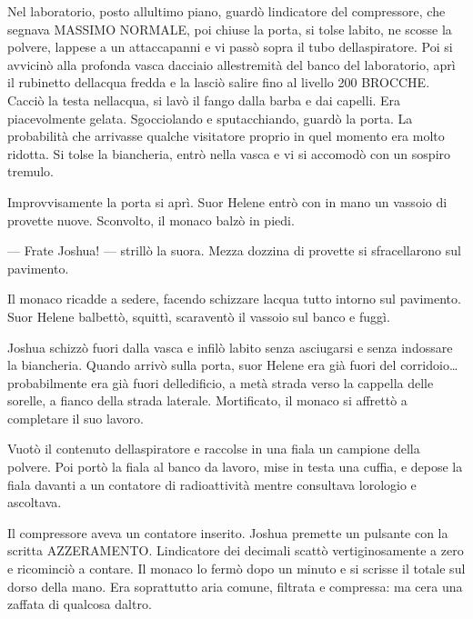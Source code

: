 	Nel laboratorio, posto all\textquotesingle ultimo piano, guardò
	l\textquotesingle indicatore del compressore, che segnava MASSIMO
	NORMALE, poi chiuse la porta, si tolse l\textquotesingle abito, ne
	scosse la polvere, l\textquotesingle appese a un attaccapanni e vi passò
	sopra il tubo dell\textquotesingle aspiratore. Poi si avvicinò alla
	profonda vasca d\textquotesingle acciaio all\textquotesingle estremità
	del banco del laboratorio, aprì il rubinetto dell\textquotesingle acqua
	fredda e la lasciò salire fino al livello 200 BROCCHE. Cacciò la testa
	nell\textquotesingle acqua, si lavò il fango dalla barba e dai capelli.
	Era piacevolmente gelata. Sgocciolando e sputacchiando, guardò la porta.
	La probabilità che arrivasse qualche visitatore proprio in quel momento
	era molto ridotta. Si tolse la biancheria, entrò nella vasca e vi si
	accomodò con un sospiro tremulo.
	
	Improvvisamente la porta si aprì. Suor Helene entrò con in mano un
	vassoio di provette nuove. Sconvolto, il monaco balzò in piedi.
	
	--- Frate Joshua! --- strillò la suora. Mezza dozzina di provette si
	sfracellarono sul pavimento.
	
	Il monaco ricadde a sedere, facendo schizzare l\textquotesingle acqua
	tutto intorno sul pavimento. Suor Helene balbettò, squittì, scaraventò
	il vassoio sul banco e fuggì.
	
	Joshua schizzò fuori dalla vasca e infilò l\textquotesingle abito senza
	asciugarsi e senza indossare la biancheria. Quando arrivò sulla porta,
	suor Helene era già fuori del corridoio\ldots{} probabilmente era già
	fuori dell\textquotesingle edificio, a metà strada verso la cappella
	delle sorelle, a fianco della strada laterale. Mortificato, il monaco si
	affrettò a completare il suo lavoro.
	
	Vuotò il contenuto dell\textquotesingle aspiratore e raccolse in una
	fiala un campione della polvere. Poi portò la fiala al banco da lavoro,
	mise in testa una cuffia, e depose la fiala davanti a un contatore di
	radioattività mentre consultava l\textquotesingle orologio e ascoltava.
	
	Il compressore aveva un contatore inserito. Joshua premette un pulsante
	con la scritta AZZERAMENTO. L\textquotesingle indicatore dei decimali
	scattò vertiginosamente a zero e ricominciò a contare. Il monaco lo
	fermò dopo un minuto e si scrisse il totale sul dorso della mano. Era
	soprattutto aria comune, filtrata e compressa: ma c\textquotesingle era
	una zaffata di qualcosa d\textquotesingle altro.
	
